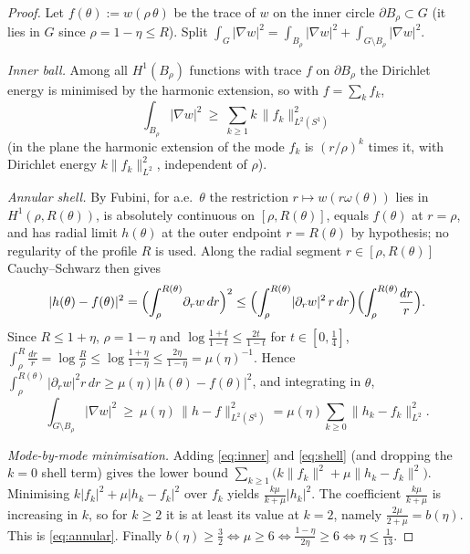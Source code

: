 \begin{proof}
Let $f(\theta):=w(\rho\,\theta)$ be the trace of $w$ on the inner circle
$\partial B_\rho\subset G$ (it lies in $G$ since $\rho=1-\eta\le R$). Split
$\int_G|\nabla w|^2=\int_{B_\rho}|\nabla w|^2+\int_{G\setminus B_\rho}
|\nabla w|^2$.

\emph{Inner ball.} Among all $H^1(B_\rho)$ functions with trace $f$ on
$\partial B_\rho$ the Dirichlet energy is minimised by the harmonic
extension, so with $f=\sum_k f_k$,
\begin{equation}\label{eq:inner}
   \int_{B_\rho}|\nabla w|^2\ \ge\ \sum_{k\ge1}k\,\|f_k\|_{L^2(S^1)}^2
\end{equation}
(in the plane the harmonic extension of the mode $f_k$ is $(r/\rho)^k$ times
it, with Dirichlet energy $k\|f_k\|_{L^2}^2$, independent of $\rho$).

\emph{Annular shell.} By Fubini, for a.e.\ $\theta$ the restriction
$r\mapsto w(r\omega(\theta))$ lies in $H^1(\rho,R(\theta))$, is absolutely
continuous on $[\rho,R(\theta)]$, equals $f(\theta)$ at $r=\rho$, and has
radial limit $h(\theta)$ at the outer endpoint $r=R(\theta)$ by hypothesis;
no regularity of the profile $R$ is used. Along the radial segment
$r\in[\rho,R(\theta)]$ Cauchy--Schwarz then gives
\[
   |h(\theta)-f(\theta)|^2
   =\Bigl(\int_\rho^{R(\theta)}\!\partial_r w\,dr\Bigr)^2
   \le\Bigl(\int_\rho^{R(\theta)}\!|\partial_r w|^2\,r\,dr\Bigr)
      \Bigl(\int_\rho^{R(\theta)}\!\frac{dr}{r}\Bigr).
\]
Since $R\le1+\eta$, $\rho=1-\eta$ and $\log\tfrac{1+t}{1-t}\le\tfrac{2t}{1-t}$
for $t\in[0,\tfrac14]$,
$\int_\rho^{R}\tfrac{dr}r=\log\tfrac{R}\rho\le\log\tfrac{1+\eta}{1-\eta}\le
\tfrac{2\eta}{1-\eta}=\mu(\eta)^{-1}$. Hence
$\int_\rho^{R(\theta)}|\partial_r w|^2 r\,dr\ge\mu(\eta)|h(\theta)-f(\theta)|^2$,
and integrating in $\theta$,
\begin{equation}\label{eq:shell}
   \int_{G\setminus B_\rho}|\nabla w|^2\ \ge\ \mu(\eta)\,\|h-f\|_{L^2(S^1)}^2
   =\mu(\eta)\sum_{k\ge0}\|h_k-f_k\|_{L^2}^2 .
\end{equation}

\emph{Mode-by-mode minimisation.} Adding \eqref{eq:inner} and
\eqref{eq:shell} (and dropping the $k=0$ shell term) gives the lower bound
$\sum_{k\ge1}\bigl(k\|f_k\|^2+\mu\|h_k-f_k\|^2\bigr)$. Minimising
$k|f_k|^2+\mu|h_k-f_k|^2$ over $f_k$ yields $\frac{k\mu}{k+\mu}|h_k|^2$. The
coefficient $\frac{k\mu}{k+\mu}$ is increasing in $k$, so for $k\ge2$ it is
at least its value at $k=2$, namely $\frac{2\mu}{2+\mu}=b(\eta)$. This is
\eqref{eq:annular}. Finally $b(\eta)\ge\tfrac32\iff\mu\ge6\iff
\frac{1-\eta}{2\eta}\ge6\iff\eta\le\tfrac1{13}$.
\end{proof}

